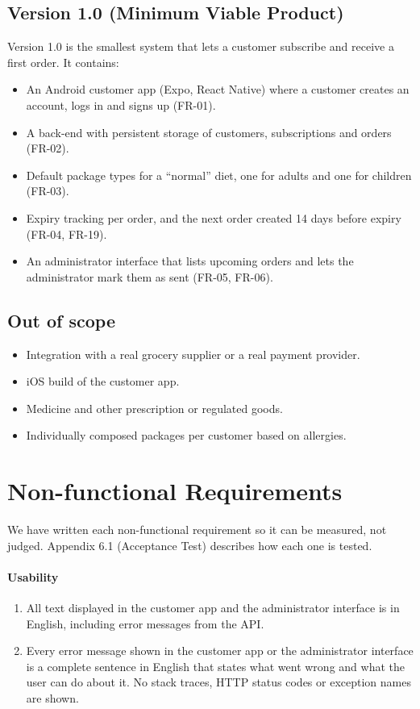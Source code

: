 \documentclass[a4paper,11pt]{article}
\begin{document}
\subsection{Version 1.0 (Minimum Viable Product)}
Version 1.0 is the smallest system that lets a customer subscribe and receive a first order. It contains:
\begin{itemize}
    \item An Android customer app (Expo, React Native) where a customer creates an account, logs in and signs up (FR-01).
    \item A back-end with persistent storage of customers, subscriptions and orders (FR-02).
    \item Default package types for a ``normal'' diet, one for adults and one for children (FR-03).
    \item Expiry tracking per order, and the next order created 14 days before expiry (FR-04, FR-19).
    \item An administrator interface that lists upcoming orders and lets the administrator mark them as sent (FR-05, FR-06).
\end{itemize}

\subsection{Out of scope}
\begin{itemize}
    \item Integration with a real grocery supplier or a real payment provider.
    \item iOS build of the customer app.
    \item Medicine and other prescription or regulated goods.
    \item Individually composed packages per customer based on allergies.
\end{itemize}

\section{Non-functional Requirements}
We have written each non-functional requirement so it can be measured, not judged. Appendix 6.1 (Acceptance Test) describes how each one is tested.

\paragraph{Usability}
\begin{enumerate}[label=\reqlabel{NFR}, start=1]
    \item All text displayed in the customer app and the administrator interface is in English, including error messages from the API.
    \item Every error message shown in the customer app or the administrator interface is a complete sentence in English that states what went wrong and what the user can do about it. No stack traces, HTTP status codes or exception names are shown.
\end{enumerate}
\end{document}
